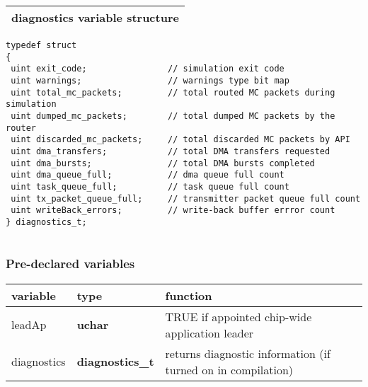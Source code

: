 \documentclass[11pt,a4paper,twoside]{article}
\begin{document}
\begin{center}
\renewcommand{\arraystretch}{1.2}
\begin{tabularx}{\textwidth}{| X |}
\hline
diagnostics variable structure \\%
\hline
\end{tabularx}


\begin{minipage}{5.5in}
\begin{lstlisting}
typedef struct
{
 uint exit_code;                // simulation exit code
 uint warnings;                 // warnings type bit map
 uint total_mc_packets;         // total routed MC packets during simulation
 uint dumped_mc_packets;        // total dumped MC packets by the router
 uint discarded_mc_packets;     // total discarded MC packets by API
 uint dma_transfers;            // total DMA transfers requested
 uint dma_bursts;               // total DMA bursts completed
 uint dma_queue_full;           // dma queue full count
 uint task_queue_full;          // task queue full count
 uint tx_packet_queue_full;     // transmitter packet queue full count
 uint writeBack_errors;         // write-back buffer errror count
} diagnostics_t;
\end{lstlisting}
\end{minipage}

\renewcommand{\arraystretch}{1.2}
\begin{tabularx}{\textwidth}{| X |}
\hline
 \\%
\hline
\end{tabularx}
\end{center}

\pagebreak

\subsubsection{Pre-declared variables}


\begin{center}
\renewcommand{\arraystretch}{1.2}
\begin{tabularx}{\textwidth}{| p{18mm} p{24mm} X |}
\hline
\textbf{variable} & \textbf{type} & \textbf{function} \\%
\hline
\hline
leadAp & \textbf{uchar} & TRUE if appointed chip-wide application leader \\%
diagnostics & \textbf{diagnostics\_t} & returns diagnostic information (if turned on in compilation) \\%
\hline
\end{tabularx}
\end{center}
\end{document}
